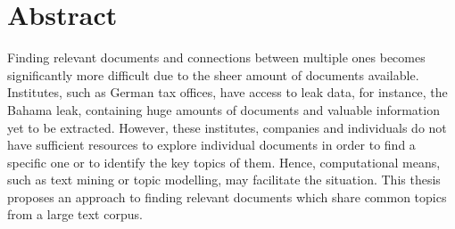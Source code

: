 \chapter*{Abstract}


Finding relevant documents and connections between multiple ones becomes significantly more difficult due to the sheer amount of documents available.
Institutes, such as German tax offices, have access to leak data, for instance, the Bahama leak, containing huge amounts of documents and valuable information yet to be extracted.
However, these institutes, companies and individuals do not have sufficient resources to explore individual documents in order to find a specific one or to identify the key topics of them.
Hence, computational means, such as text mining or topic modelling, may facilitate the situation.
This thesis proposes an approach to finding relevant documents which share common topics from a large text corpus.